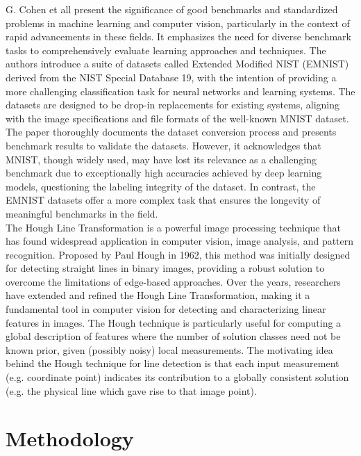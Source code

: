 G. Cohen et all present the significance of good benchmarks and standardized problems in machine learning and computer vision, particularly in the context of rapid advancements in these fields. It emphasizes the need for diverse benchmark tasks to comprehensively evaluate learning approaches and techniques. The authors introduce a suite of datasets called Extended Modified NIST (EMNIST) derived from the NIST Special Database 19, with the intention of providing a more challenging classification task for neural networks and learning systems. The datasets are designed to be drop-in replacements for existing systems, aligning with the image specifications and file formats of the well-known MNIST dataset. The paper thoroughly documents the dataset conversion process and presents benchmark results to validate the datasets. However, it acknowledges that MNIST, though widely used, may have lost its relevance as a challenging benchmark due 
to exceptionally high accuracies achieved by deep learning models, questioning the labeling integrity of the dataset. In contrast, the EMNIST datasets offer a more complex task that ensures the longevity of meaningful benchmarks in the field\cite{cohen2017emnist}.
\\
The Hough Line Transformation is a powerful image processing technique that has found widespread application in computer vision, image analysis, and pattern recognition. Proposed by Paul Hough in 1962, this method was initially designed for detecting straight lines in binary images, providing a robust solution to overcome the limitations of edge-based approaches. Over the years, researchers have extended and refined the Hough Line Transformation, making it a fundamental tool in computer vision for detecting and characterizing linear features in images. The Hough technique is particularly useful for computing a global description of features where the number of solution classes need not be known prior, given (possibly noisy) local measurements. The motivating idea behind the Hough technique for line detection is that each input measurement (e.g. coordinate point) indicates its contribution to a globally consistent solution (e.g. the physical line which gave rise to that image point)\cite{Ballard1982ComputerVision}. 

\chapter{Methodology}
